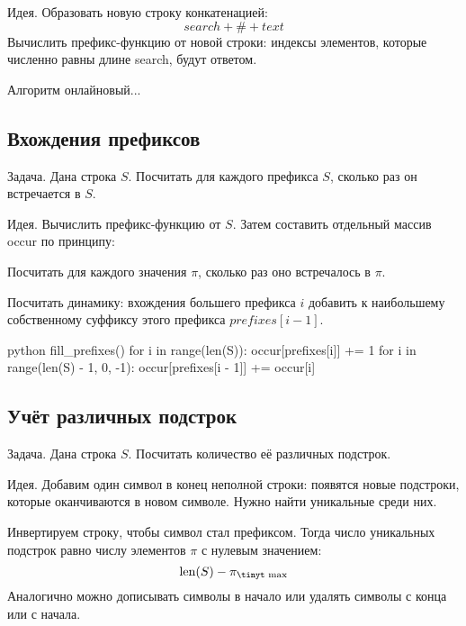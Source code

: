 {\bold Идея.} Образовать новую строку конкатенацией:
$$search+\#+text$$
Вычислить {\ital префикс-функцию} от новой строки: индексы элементов, которые численно равны длине {\ital search}, будут ответом. 

Алгоритм {\ital онлайновый}...

\subsection{Вхождения префиксов}

\begin{theorem}
{\bold Задача.} Дана строка $S$. Посчитать для каждого префикса $S$, сколько раз он встречается в $S$.
\end{theorem}

{\bold Идея.} Вычислить префикс-функцию от $S$. Затем составить отдельный массив {\ital occur} по принципу:
\begin{list*}[][\#]
\item Посчитать для каждого значения $\pi$, сколько раз оно встречалось в $\pi$.
\item Посчитать {\ital динамику}: вхождения большего префикса $i$ добавить к наибольшему собственному суффиксу этого префикса $prefixes[i-1]$.
\end{list*}
\begin{code}{python}
fill_prefixes()
for i in range(len(S)):
  occur[prefixes[i]] += 1
for i in range(len(S) - 1, 0, -1):
  occur[prefixes[i - 1]] += occur[i]
\end{code}

\subsection{Учёт различных подстрок}

\begin{theorem}
{\bold Задача.} Дана строка $S$. Посчитать количество её различных подстрок.
\end{theorem}

{\bold Идея.} Добавим один символ в конец неполной строки: появятся новые подстроки, которые оканчиваются в новом символе. Нужно найти {\ital уникальные} среди них.

Инвертируем строку, чтобы символ стал префиксом. Тогда число уникальных подстрок равно числу элементов $\pi$ с нулевым значением:
$$\text{len}(S)-\pi_\text{\tinyt max}$$
Аналогично можно дописывать символы в начало или удалять символы с конца или с начала.

